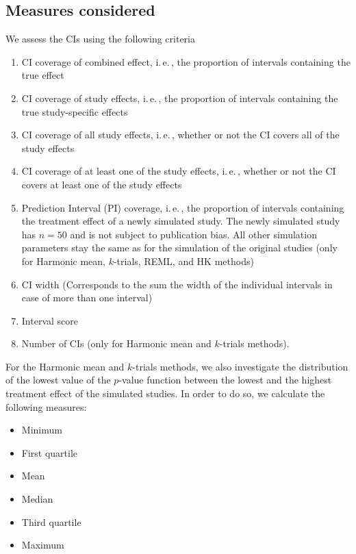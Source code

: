 \documentclass[letterpaper, 12pt]{article}
\newcommand{\ie}{{i.\,e.\,}}
\begin{document}
\subsection{Measures considered} \label{sec:meas}

We assess the CIs using the following criteria
  \begin{enumerate}
  \item CI coverage of combined effect, \ie, the proportion of intervals containing the true effect %
  \item CI coverage of study effects, \ie, the proportion of intervals containing the true study-specific effects %
  \item CI coverage of all study effects, \ie, whether or not the CI covers all of the study effects %
  \item CI coverage of at least one of the study effects, \ie, whether or not the CI covers at least one of the study effects %
  \item Prediction Interval (PI) coverage, \ie, the proportion of intervals containing the treatment effect of a newly simulated study. The newly simulated study has $n = 50$ and is not subject to publication bias. All other simulation parameters stay the same as for the simulation of the original studies (only for Harmonic mean, $k$-trials, REML, and HK methods) %
  \item CI width (Corresponds to the sum the width of the individual intervals in case of more than one interval)%
  \item Interval score \citep{Gnei:Raft:07} %
  \item Number of CIs (only for Harmonic mean and $k$-trials methods). %
  \end{enumerate}

\vspace*{.5cm}

For the Harmonic mean and $k$-trials methods, we also investigate the distribution of the lowest value of the $p$-value function between the lowest and the highest treatment effect of the simulated studies. In order to do so, we calculate the following measures:
\begin{itemize}
\item Minimum
\item First quartile
\item Mean
\item Median
\item Third quartile
\item Maximum
\end{itemize}
\end{document}
